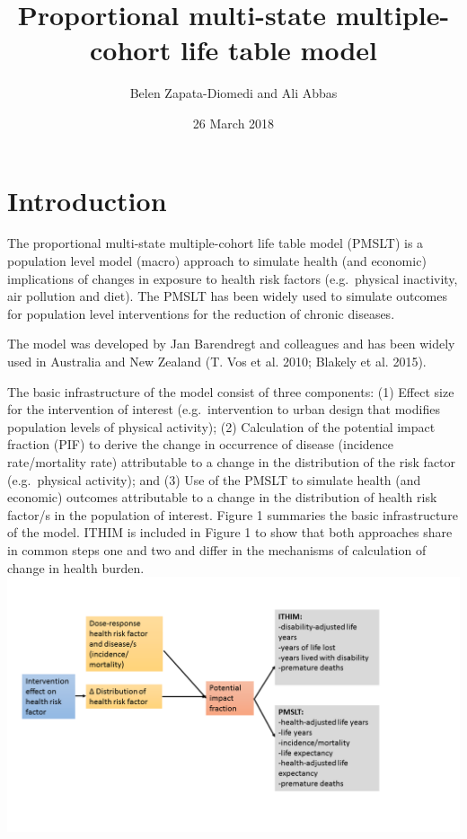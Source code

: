 \documentclass[]{article}
\title{Proportional multi-state multiple-cohort life table model}
\author{Belen Zapata-Diomedi and Ali Abbas}
\date{26 March 2018}
\begin{document}
\maketitle

{
\setcounter{tocdepth}{2}
\tableofcontents
}
\section{Introduction}\label{introduction}

The proportional multi-state multiple-cohort life table model (PMSLT) is
a population level model (macro) approach to simulate health (and
economic) implications of changes in exposure to health risk factors
(e.g.~physical inactivity, air pollution and diet). The PMSLT has been
widely used to simulate outcomes for population level interventions for
the reduction of chronic diseases.

The model was developed by Jan Barendregt and colleagues and has been
widely used in Australia and New Zealand (T. Vos et al. 2010; Blakely et
al. 2015).

The basic infrastructure of the model consist of three components: (1)
Effect size for the intervention of interest (e.g.~intervention to urban
design that modifies population levels of physical activity); (2)
Calculation of the potential impact fraction (PIF) to derive the change
in occurrence of disease (incidence rate/mortality rate) attributable to
a change in the distribution of the risk factor (e.g.~physical
activity); and (3) Use of the PMSLT to simulate health (and economic)
outcomes attributable to a change in the distribution of health risk
factor/s in the population of interest. Figure 1 summaries the basic
infrastructure of the model. ITHIM is included in Figure 1 to show that
both approaches share in common steps one and two and differ in the
mechanisms of calculation of change in health burden.
\includegraphics{structure/Figure1.png}
\end{document}
